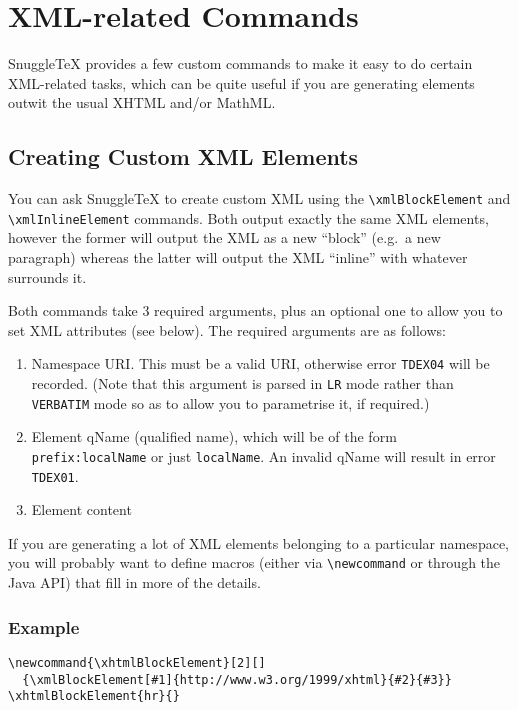 
\section*{XML-related Commands}

SnuggleTeX provides a few custom commands to make it
easy to do certain XML-related tasks, which can be quite
useful if you are generating elements outwit the usual
XHTML and/or MathML.

\subsection*{Creating Custom XML Elements}

You can ask SnuggleTeX to create custom XML using the
\verb|\xmlBlockElement| and \verb|\xmlInlineElement|
commands. Both output exactly the same XML elements,
however the former will output the XML as a new ``block''
(e.g.\ a new paragraph) whereas the latter will output
the XML ``inline'' with whatever surrounds it.

Both commands take 3 required arguments, plus an
optional one to allow you to set XML attributes
(see below). The required arguments are as follows:

\begin{enumerate}
  \item Namespace URI. This must be a valid URI, otherwise
    error \verb|TDEX04| will be recorded. 
    (Note that this argument is parsed in \verb|LR| mode
    rather than \verb|VERBATIM| mode so as to allow you to
    parametrise it, if required.)
  \item Element qName (qualified name), which will be of
    the form \verb|prefix:localName| or just
    \verb|localName|. An invalid qName will result in
    error \verb|TDEX01|.
  \item Element content
\end{enumerate}

If you are generating a lot of XML elements belonging
to a particular namespace, you will probably want to
define macros (either via \verb|\newcommand| or
through the Java API) that fill in more of the details.

\subsubsection*{Example}

\begin{verbatim}
\newcommand{\xhtmlBlockElement}[2][]
  {\xmlBlockElement[#1]{http://www.w3.org/1999/xhtml}{#2}{#3}}
\xhtmlBlockElement{hr}{}
\end{verbatim}

